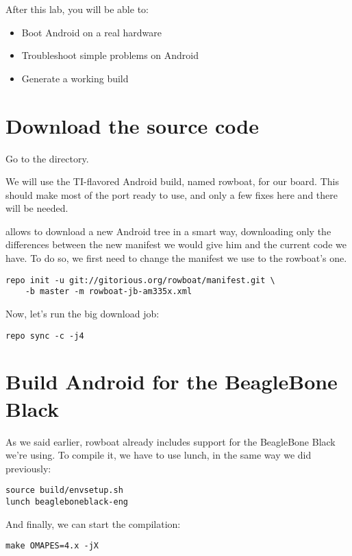 
After this lab, you will be able to:
\begin{itemize}
  \item Boot Android on a real hardware
  \item Troubleshoot simple problems on Android
  \item Generate a working build
\end{itemize}

\section{Download the source code}

Go to the  directory.

We will use the TI-flavored Android build, named rowboat, for our
board. This should make most of the port ready to use, and only a few
fixes here and there will be needed.

 allows to download a new Android tree in a smart way,
downloading only the differences between the new manifest we would
give him and the current code we have. To do so, we first need to
change the manifest we use to the rowboat's one.

\begin{verbatim}
repo init -u git://gitorious.org/rowboat/manifest.git \
    -b master -m rowboat-jb-am335x.xml
\end{verbatim}

Now, let's run the big download job:
\begin{verbatim}
repo sync -c -j4
\end{verbatim}

\section{Build Android for the BeagleBone Black}

As we said earlier, rowboat already includes support for the
BeagleBone Black we're using. To compile it, we have to use lunch, in
the same way we did previously:

\begin{verbatim}
source build/envsetup.sh
lunch beagleboneblack-eng
\end{verbatim}

And finally, we can start the compilation:

\begin{verbatim}
make OMAPES=4.x -jX
\end{verbatim}

